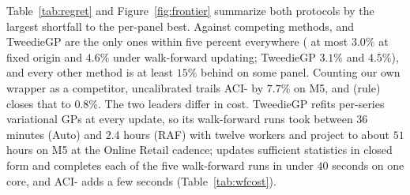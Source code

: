 Table~\ref{tab:regret} and Figure~\ref{fig:frontier} summarize both
protocols by the largest shortfall to the per-panel best. Against
competing methods, \EBB{} and TweedieGP are the only ones within five
percent everywhere (\EBB{} at most $3.0\%$ at fixed origin and $4.6\%$
under walk-forward updating; TweedieGP $3.1\%$ and $4.5\%$), and every
other method is at least $15\%$ behind on some panel. Counting our own
wrapper as a competitor, uncalibrated \EBB{} trails ACI-\EBB{} by $7.7\%$
on M5, and \EBB{} (rule) closes that to 0.8\%. The two leaders differ in cost. TweedieGP refits per-series
variational GPs at every update, so its walk-forward runs took between
$36$ minutes (Auto) and $2.4$ hours (RAF) with twelve workers and project
to about $51$ hours on M5 at the Online Retail cadence; \EBB{} updates
sufficient statistics in closed form and completes each of the five
walk-forward runs in under $40$ seconds on one core, and ACI-\EBB{} adds
a few seconds (Table~\ref{tab:wfcost}).


